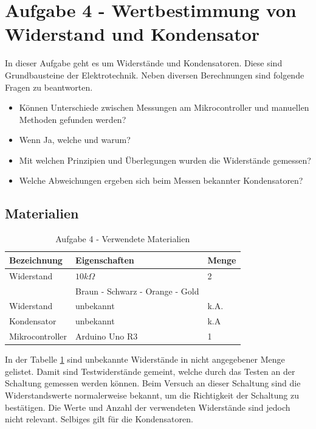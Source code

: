 \section{Aufgabe 4 - Wertbestimmung von Widerstand und Kondensator}
\label{sec:aufgabe-4---wertbestimmung-von-widerstand-und-kondensator}

In dieser Aufgabe geht es um Widerstände und Kondensatoren.
Diese sind Grundbausteine der Elektrotechnik.
Neben diversen Berechnungen sind folgende Fragen zu beantworten.

\begin{itemize}
    \item Können Unterschiede zwischen Messungen am Mikrocontroller und manuellen Methoden gefunden werden?
    \item Wenn Ja, welche und warum?
    \item Mit welchen Prinzipien und Überlegungen wurden die Widerstände gemessen?
    \item Welche Abweichungen ergeben sich beim Messen bekannter Kondensatoren?
\end{itemize}

\subsection{Materialien}
\label{subsec:a4-materialien}

\begin{table}[h]
    \centering
    \caption{Aufgabe 4 - Verwendete Materialien}
    \label{tab:a4-materialien}
    \begin{tabular}{| l | l | l |}
        \hline
        Bezeichnung & Eigenschaften & Menge \\
        \hline
        Widerstand  & $10k\Omega$   & 2     \\
        & Braun - Schwarz - Orange - Gold & \\
        Widerstand & unbekannt & k.A. \\
        Kondensator & unbekannt & k.A \\
        Mikrocontroller & Arduino Uno R3 & 1 \\
        \hline
    \end{tabular}
\end{table}

In der Tabelle \ref{tab:a4-materialien} sind unbekannte Widerstände in nicht angegebener Menge gelistet.
Damit sind Testwiderstände gemeint, welche durch das Testen an der Schaltung gemessen werden können.
Beim Versuch an dieser Schaltung sind die Widerstandswerte normalerweise bekannt, um die Richtigkeit der Schaltung zu bestätigen.
Die Werte und Anzahl der verwendeten Widerstände sind jedoch nicht relevant.
Selbiges gilt für die Kondensatoren.

